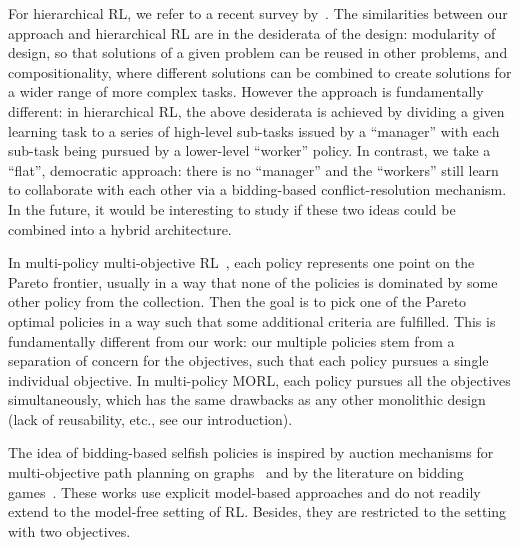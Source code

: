 For hierarchical RL, we refer to a recent survey by~\citet{klissarov2025discovering}. 
The similarities between our approach and hierarchical RL are in the desiderata of the design: modularity of design, so that solutions of a given problem can be reused in other problems, and compositionality, where different solutions can be combined to create solutions for a wider range of more complex tasks. 
However the approach is fundamentally different: in hierarchical RL, the above desiderata is achieved by dividing a given learning task to a series of high-level sub-tasks issued by a ``manager'' with each sub-task being pursued by a lower-level ``worker'' policy. 
In contrast, we take a ``flat'', democratic approach: there is no ``manager'' and the ``workers'' still learn to collaborate with each other via a bidding-based conflict-resolution mechanism. 
In the future, it would be interesting to study if these two ideas could be combined into a hybrid architecture.

In multi-policy multi-objective RL~\citep{ding2024multi,zhao2025multi}, each policy represents one point on the Pareto frontier, usually in a way that none of the policies is dominated by some other policy from the collection. 
Then the goal is to pick one of the Pareto optimal policies in a way such that some additional criteria are fulfilled. 
This is fundamentally different from our work: our multiple policies stem from a separation of concern for the objectives, such that each policy pursues a single individual objective. 
In multi-policy MORL, each policy pursues all the objectives simultaneously, which has the same drawbacks as any other monolithic design (lack of reusability, etc., see our introduction).

The idea of bidding-based selfish policies is inspired by auction mechanisms for multi-objective path planning on graphs~\citep{avni2024auction} and by the literature on bidding games~\citep{lazarus1999combinatorial,avni2019infinite,avni2025bidding}. These works use explicit model-based approaches and do not readily extend to the model-free setting of RL.
Besides, they are restricted to the setting with two objectives.
